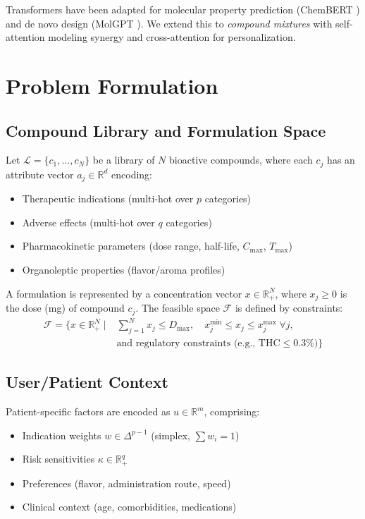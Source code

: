 \documentclass[11pt,a4paper]{article}
\begin{document}
Transformers have been adapted for molecular property prediction (ChemBERT \cite{Chithrananda2020}) and de novo design (MolGPT \cite{Bagal2022}). We extend this to \textit{compound mixtures} with self-attention modeling synergy and cross-attention for personalization.

\section{Problem Formulation}

\subsection{Compound Library and Formulation Space}

Let \(\mathcal{L} = \{c_1, \dots, c_N\}\) be a library of \(N\) bioactive compounds, where each \(c_j\) has an attribute vector \(a_j \in \mathbb{R}^d\) encoding:
\begin{itemize}
    \item Therapeutic indications (multi-hot over \(p\) categories)
    \item Adverse effects (multi-hot over \(q\) categories)
    \item Pharmacokinetic parameters (dose range, half-life, \(C_{\max}\), \(T_{\max}\))
    \item Organoleptic properties (flavor/aroma profiles)
\end{itemize}

A formulation is represented by a concentration vector \(x \in \mathbb{R}_+^N\), where \(x_j \geq 0\) is the dose (mg) of compound \(c_j\). The feasible space \(\mathcal{F}\) is defined by constraints:
\begin{align}
\mathcal{F} = \Big\{ x \in \mathbb{R}_+^N \mid& \sum_{j=1}^N x_j \leq D_{\max}, \quad x_j^{\min} \leq x_j \leq x_j^{\max} \;\forall j, \nonumber \\
& \text{and regulatory constraints (e.g., THC} \leq 0.3\%) \Big\}
\end{align}

\subsection{User/Patient Context}

Patient-specific factors are encoded as \(u \in \mathbb{R}^m\), comprising:
\begin{itemize}
    \item Indication weights \(w \in \Delta^{p-1}\) (simplex, \(\sum w_i = 1\))
    \item Risk sensitivities \(\kappa \in \mathbb{R}_+^q\)
    \item Preferences (flavor, administration route, speed)
    \item Clinical context (age, comorbidities, medications)
\end{itemize}
\end{document}
